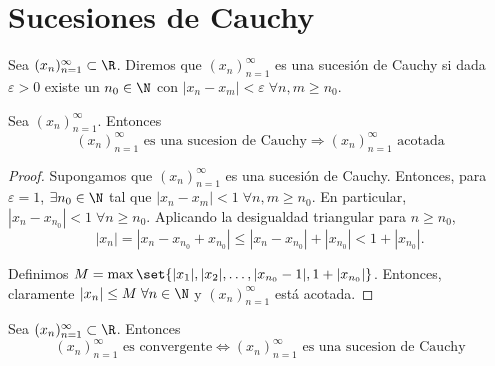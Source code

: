 \section{Sucesiones de Cauchy}
\begin{definition}
	Sea \((x_n)^{\infty}_{n=1} \subset \R\). Diremos que \((x_n)^{\infty}_{n=1} \) es una sucesión de Cauchy si dada \(\varepsilon > 0 \) existe un \(n_0 \in \N \) con \(|x_n - x_m | < \varepsilon \; \forall n, m \geq n_0 \).
\end{definition}
\begin{proposition}
	\label{cauchyac}
	Sea \((x_n)^{\infty}_{n=1} \). Entonces
	\[
		(x_n)^{\infty}_{n=1} \text{ es una sucesion de Cauchy} \Rightarrow (x_n)^{\infty}_{n=1} \text{ acotada}
	\]
\end{proposition}
\begin{proof}
	Supongamos que \((x_n)^{\infty}_{n=1}\) es una sucesión de Cauchy. Entonces, para \(\varepsilon = 1 \), \(\exists n_0 \in \N\) tal que \(\left\vert x_n - x_m  \right\vert < 1 \; \forall n,m \geq n_0\). En particular, \(\left\vert x_n - x_{n_0 } \right\vert < 1\; \forall n \geq n_0\). Aplicando la desigualdad triangular para \(n \geq n_0\), 
	\[
		\left\vert x_n  \right\vert = \left\vert x_n - x_{n_0} + x_{n_0} \right\vert \leq \left\vert x_n - x_{n_0} \right\vert + \left\vert x_{n_0} \right\vert < 1 + \left\vert x_{n_0} \right\vert.
	\]
	
	Definimos \(M = \max\set{|x_1|, |x_2|, \ldots, |x_{n_0} - 1|, 1 + \left\vert x_{n_0} \right\vert }\). Entonces, claramente \(|x_n| \leq M \; \forall n \in \N \) y \((x_n)^{\infty}_{n=1}\) está acotada. 
\end{proof}
\begin{theorem}
	Sea \((x_n)^{\infty}_{n=1} \subset \R \). Entonces
	\[
		(x_n)^{\infty}_{n=1} \text{ es convergente} \iff (x_n)^{\infty}_{n=1} \text{ es una sucesion de Cauchy}
	\]
\end{theorem}
